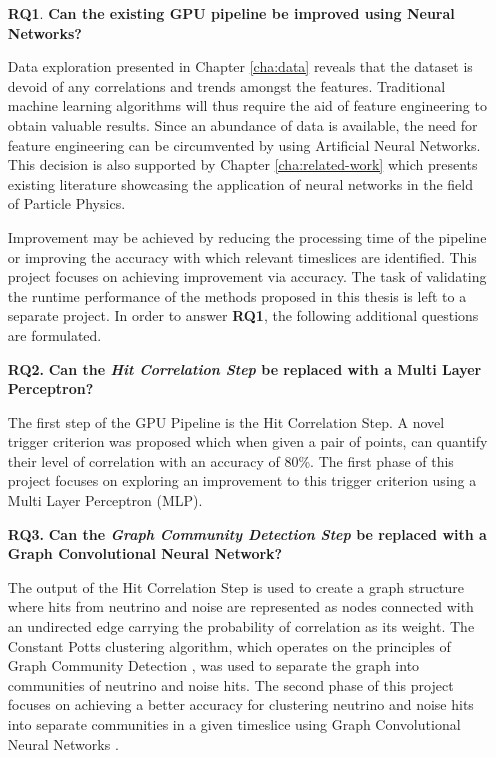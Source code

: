\begin{enumerate}
  \item[\textbf{RQ1}.] \textbf{Can the existing GPU pipeline be improved using Neural Networks?}

    Data exploration presented in Chapter \ref{cha:data} reveals that
    the dataset is devoid of any correlations and trends amongst the
    features. Traditional machine learning algorithms will thus
    require the aid of feature engineering to obtain valuable results.
    Since an abundance of data is available, the need for feature
    engineering can be circumvented by using Artificial Neural
    Networks. This decision is also supported by Chapter
    \ref{cha:related-work} which presents existing literature
    showcasing the application of neural networks in the field of
    Particle Physics.

    Improvement may be achieved by reducing the processing time of the
    pipeline or improving the accuracy with which relevant timeslices
    are identified. This project focuses on achieving improvement via
    accuracy. The task of validating the runtime performance of the
    methods proposed in this thesis is left to a separate project. In
    order to answer \textbf{RQ1}, the following additional questions
    are formulated.

  \item[\textbf{RQ2.}] \textbf{Can the \emph{Hit Correlation Step} be replaced with a Multi Layer Perceptron?}

    The first step of the GPU Pipeline is the Hit Correlation Step. A
    novel trigger criterion was proposed which when given a pair of
    points, can quantify their level of correlation with an accuracy
    of 80\%. The first phase of this project focuses on exploring an
    improvement to this trigger criterion using a Multi Layer
    Perceptron (MLP).
    
  \item[\textbf{RQ3.}] \textbf{Can the \emph{Graph Community Detection Step} be replaced with a Graph Convolutional Neural Network?}

    The output of the Hit Correlation Step is used to create a graph
    structure where hits from neutrino and noise are represented as
    nodes connected with an undirected edge carrying the probability
    of correlation as its weight. The Constant Potts clustering
    algorithm, which operates on the principles of Graph Community
    Detection \cite{fortunato2010community}, was used to separate the
    graph into communities of neutrino and noise hits. The second
    phase of this project focuses on achieving a better accuracy for
    clustering neutrino and noise hits into separate communities in a
    given timeslice using Graph Convolutional Neural Networks
    \cite{kipf2016semi}.
\end{enumerate}

